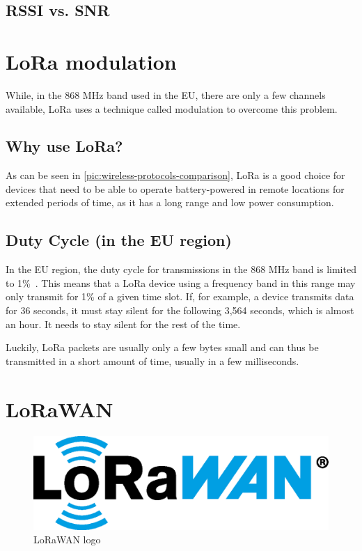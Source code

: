 \subsection{\ac{RSSI} vs. \ac{SNR}}

\section{\acf{LoRa} modulation}

While, in the 868 MHz band used in the \ac{EU}, there are only a few channels available, \ac{LoRa} uses a technique called modulation to overcome this problem.


\subsection{Why use \ac{LoRa}?}

As can be seen in \cref{pic:wireless-protocols-comparison}, \ac{LoRa} is a good choice for devices that need to be able to operate battery-powered in remote locations for extended periods of time, as it has a long range and low power consumption.

\subsection{Duty Cycle (in the \ac{EU} region)}


In the \ac{EU} region, the duty cycle for transmissions in the 868 MHz band is limited to 1\%~\cite{etsi_etsi_2012}.
This means that a \ac{LoRa} device using a frequency band in this range may only transmit for 1\% of a given time slot.
If, for example, a device transmits data for 36 seconds, it must stay silent for the following 3,564 seconds, which is almost an hour.
It needs to stay silent for the rest of the time.

Luckily, LoRa packets are usually only a few bytes small and can thus be transmitted in a short amount of time, usually in a few milliseconds.

\section{\acf{LoRaWAN}}

\begin{figure}[h]
    \centering
    \includegraphics[width=.4\textwidth]{pictures/logos/LoRaWAN_Logo.eps}
    \caption{\ac{LoRaWAN} logo~\protect\cite{lora_alliance_francais_2022}}
\end{figure}

